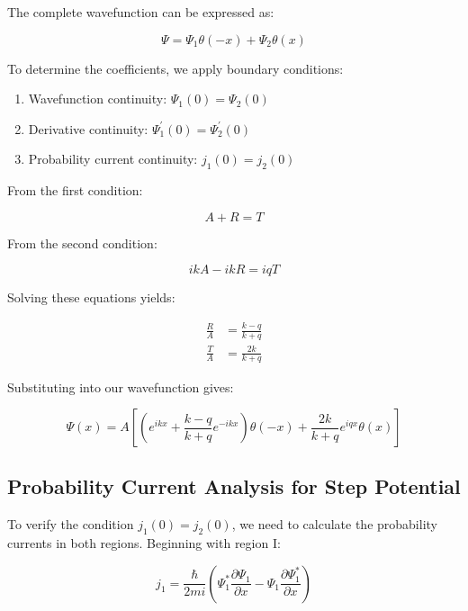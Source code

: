 \documentclass[italian]{HKNdocument}
\begin{document}
The complete wavefunction can be expressed as:

\begin{equation}
\Psi=\Psi_{1} \theta(-x)+\Psi_{2} \theta(x) \label{eq:6.14}
\end{equation}

To determine the coefficients, we apply boundary conditions:

\begin{enumerate}
  \item Wavefunction continuity: $\Psi_{1}(0)=\Psi_{2}(0)$
  \item Derivative continuity: $\Psi_{1}^{\prime}(0)=\Psi_{2}^{\prime}(0)$
  \item Probability current continuity: $j_{1}(0)=j_{2}(0)$
\end{enumerate}

From the first condition:

\begin{equation}
A+R=T \label{eq:6.15}
\end{equation}

From the second condition:

\begin{equation}
i k A-i k R=i q T \label{eq:6.16}
\end{equation}

Solving these equations yields:

\begin{align}
\frac{R}{A} & =\frac{k-q}{k+q} \\
\frac{T}{A} & =\frac{2 k}{k+q} \label{eq:6.17}
\end{align}

Substituting into our wavefunction gives:

\begin{equation}
\Psi(x)=A\left[\left(e^{i k x}+\frac{k-q}{k+q} e^{-i k x}\right) \theta(-x)+\frac{2 k}{k+q} e^{i q x} \theta(x)\right] \label{eq:6.18}
\end{equation}


\subsection{Probability Current Analysis for Step Potential}

To verify the condition $j_{1}(0)=j_{2}(0)$, we need to calculate the probability currents in both regions. Beginning with region I:

\begin{equation}
j_{1}=\frac{\hbar}{2 m i}\left(\Psi_{1}^{*} \frac{\partial \Psi_{1}}{\partial x}-\Psi_{1} \frac{\partial \Psi_{1}^{*}}{\partial x}\right) \label{eq:6.19}
\end{equation}
\end{document}
